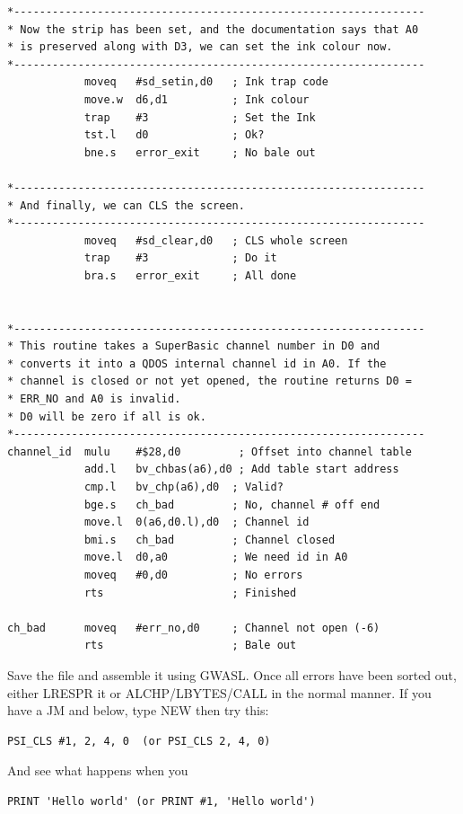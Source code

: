 \begin{lstlisting}[firstnumber=last,caption={PSI\_CLS - The Final Version - Part 2},label={lst:PsiClsFinalVersionPart2}]
*----------------------------------------------------------------
* Now the strip has been set, and the documentation says that A0
* is preserved along with D3, we can set the ink colour now.
*----------------------------------------------------------------
            moveq   #sd_setin,d0   ; Ink trap code
            move.w  d6,d1          ; Ink colour
            trap    #3             ; Set the Ink
            tst.l   d0             ; Ok?
            bne.s   error_exit     ; No bale out

*----------------------------------------------------------------
* And finally, we can CLS the screen. 
*----------------------------------------------------------------
            moveq   #sd_clear,d0   ; CLS whole screen
            trap    #3             ; Do it
            bra.s   error_exit     ; All done


*----------------------------------------------------------------
* This routine takes a SuperBasic channel number in D0 and 
* converts it into a QDOS internal channel id in A0. If the 
* channel is closed or not yet opened, the routine returns D0 = 
* ERR_NO and A0 is invalid. 
* D0 will be zero if all is ok.
*----------------------------------------------------------------
channel_id  mulu    #$28,d0         ; Offset into channel table
            add.l   bv_chbas(a6),d0 ; Add table start address
            cmp.l   bv_chp(a6),d0  ; Valid?
            bge.s   ch_bad         ; No, channel # off end
            move.l  0(a6,d0.l),d0  ; Channel id
            bmi.s   ch_bad         ; Channel closed
            move.l  d0,a0          ; We need id in A0
            moveq   #0,d0          ; No errors
            rts                    ; Finished

ch_bad      moveq   #err_no,d0     ; Channel not open (-6)
            rts                    ; Bale out
\end{lstlisting}

Save the file and assemble it using GWASL. Once all errors have been
    sorted out, either LRESPR it or ALCHP/LBYTES/CALL in the normal manner. If
    you have a JM and below, type NEW then try this:

\begin{lstlisting}[firstnumber=1,]
PSI_CLS #1, 2, 4, 0  (or PSI_CLS 2, 4, 0)
\end{lstlisting}

And see what happens when you

\begin{lstlisting}[firstnumber=1,]
PRINT 'Hello world' (or PRINT #1, 'Hello world')
\end{lstlisting}

